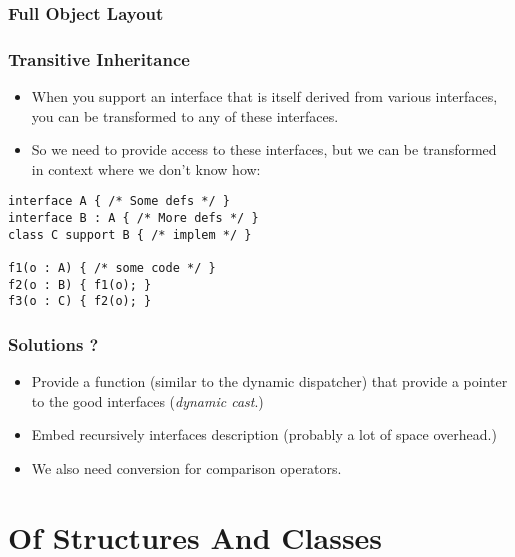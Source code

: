 \documentclass{beamer}
\begin{document}

\begin{frame}
  \frametitle{Full Object Layout}
  \begin{center}
  \end{center}
\end{frame}

\begin{frame}[fragile]
  \frametitle{Transitive Inheritance}
  \begin{itemize}
  \item When you support an interface that is itself derived from various
    interfaces, you can be transformed to any of these interfaces.
  \item So we need to provide access to these interfaces, but we can be
    transformed in context where we don't know how:
  \end{itemize}
  \begin{BoxedExample}
    \footnotesize
\begin{lstlisting}
interface A { /* Some defs */ }
interface B : A { /* More defs */ }
class C support B { /* implem */ }

f1(o : A) { /* some code */ }
f2(o : B) { f1(o); }
f3(o : C) { f2(o); }
\end{lstlisting}
  \end{BoxedExample}
\end{frame}

\begin{frame}
  \frametitle{Solutions ?}
  \begin{itemize}
  \item Provide a function (similar to the dynamic dispatcher) that provide a
    pointer to the good interfaces (\emph{dynamic cast}.)
  \item Embed recursively interfaces description (probably a lot of
    space overhead.)
  \item We also need conversion for comparison operators.
  \end{itemize}
\end{frame}

\section{Of Structures And Classes}
\end{document}
